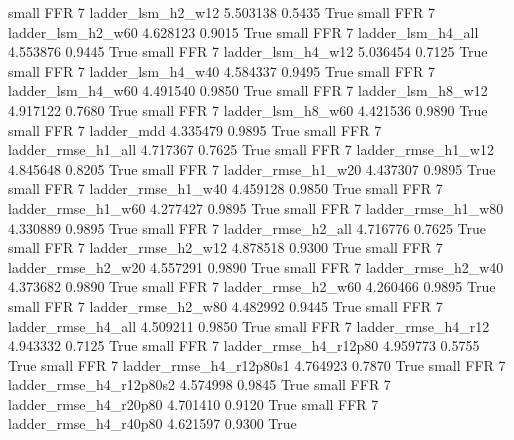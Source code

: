     small      FFR                 7        ladder_lsm_h2_w12   5.503138      0.5435    True
     small      FFR                 7        ladder_lsm_h2_w60   4.628123      0.9015    True
     small      FFR                 7        ladder_lsm_h4_all   4.553876      0.9445    True
     small      FFR                 7        ladder_lsm_h4_w12   5.036454      0.7125    True
     small      FFR                 7        ladder_lsm_h4_w40   4.584337      0.9495    True
     small      FFR                 7        ladder_lsm_h4_w60   4.491540      0.9850    True
     small      FFR                 7        ladder_lsm_h8_w12   4.917122      0.7680    True
     small      FFR                 7        ladder_lsm_h8_w60   4.421536      0.9890    True
     small      FFR                 7               ladder_mdd   4.335479      0.9895    True
     small      FFR                 7       ladder_rmse_h1_all   4.717367      0.7625    True
     small      FFR                 7       ladder_rmse_h1_w12   4.845648      0.8205    True
     small      FFR                 7       ladder_rmse_h1_w20   4.437307      0.9895    True
     small      FFR                 7       ladder_rmse_h1_w40   4.459128      0.9850    True
     small      FFR                 7       ladder_rmse_h1_w60   4.277427      0.9895    True
     small      FFR                 7       ladder_rmse_h1_w80   4.330889      0.9895    True
     small      FFR                 7       ladder_rmse_h2_all   4.716776      0.7625    True
     small      FFR                 7       ladder_rmse_h2_w12   4.878518      0.9300    True
     small      FFR                 7       ladder_rmse_h2_w20   4.557291      0.9890    True
     small      FFR                 7       ladder_rmse_h2_w40   4.373682      0.9890    True
     small      FFR                 7       ladder_rmse_h2_w60   4.260466      0.9895    True
     small      FFR                 7       ladder_rmse_h2_w80   4.482992      0.9445    True
     small      FFR                 7       ladder_rmse_h4_all   4.509211      0.9850    True
     small      FFR                 7       ladder_rmse_h4_r12   4.943332      0.7125    True
     small      FFR                 7    ladder_rmse_h4_r12p80   4.959773      0.5755    True
     small      FFR                 7  ladder_rmse_h4_r12p80s1   4.764923      0.7870    True
     small      FFR                 7  ladder_rmse_h4_r12p80s2   4.574998      0.9845    True
     small      FFR                 7    ladder_rmse_h4_r20p80   4.701410      0.9120    True
     small      FFR                 7    ladder_rmse_h4_r40p80   4.621597      0.9300    True
